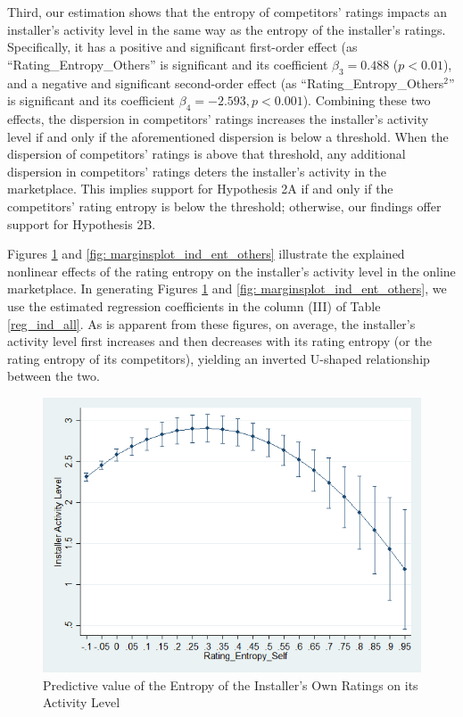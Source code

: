 \documentclass[msom,blindrev]{informs3}
\begin{document}
	Third,  our estimation shows that the entropy of competitors' ratings impacts an installer's activity level in the same way as the entropy of the installer's ratings. Specifically, it has a positive and significant first-order effect (as ``Rating\_Entropy\_Others'' is significant and its coefficient $\beta_{3} =  0.488$ ($p<0.01$), and a negative and significant second-order effect (as ``Rating\_Entropy\_Others$^{2}$'' is significant and its coefficient $\beta_{4} = -2.593, p<0.001$). Combining these two effects,
	the dispersion in competitors' ratings increases the installer's activity level if and only if the aforementioned dispersion is below a threshold. When the dispersion of competitors' ratings is above that threshold, any additional dispersion in competitors' ratings deters the installer's activity in the marketplace. This implies support for Hypothesis 2A if and only if the competitors' rating entropy is below the threshold; otherwise, our findings offer support for Hypothesis 2B.
	
	
	Figures \ref{fig: marginsplot_ind_ent_self} and  \ref{fig: marginsplot_ind_ent_others} illustrate the explained nonlinear effects of the rating entropy on the installer's activity level in the online marketplace. In generating Figures \ref{fig: marginsplot_ind_ent_self} and  \ref{fig: marginsplot_ind_ent_others}, we use the estimated regression coefficients in the column (III) of Table \ref{reg_ind_all}. As is apparent from these figures, on average, the installer's activity level first increases and then decreases with its rating entropy (or the rating entropy of its competitors), yielding an inverted U-shaped relationship between the two.
	
	\begin{figure}
		\centering
		\includegraphics[width=0.7\linewidth]{marginsplot_entself.png}
		\caption{Predictive value of the Entropy of the Installer's Own Ratings on its Activity Level}
		\label{fig: marginsplot_ind_ent_self}
	\end{figure}
	
\end{document}
